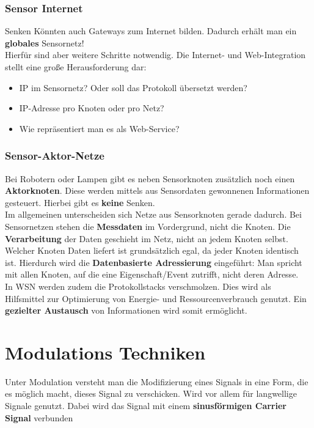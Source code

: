 \documentclass[a4paper]{article}
\begin{document}
\subsubsection{Sensor Internet}
Senken Könnten auch Gateways zum Internet bilden. Dadurch erhält man ein \textbf{globales} Sensornetz! \\
Hierfür sind aber weitere Schritte notwendig. Die Internet- und Web-Integration stellt eine große Herausforderung dar:
\begin{itemize}
	\item IP im Sensornetz? Oder soll das Protokoll übersetzt werden?
	\item IP-Adresse pro Knoten oder pro Netz?
	\item Wie repräsentiert man es als Web-Service?
\end{itemize}
\subsubsection{Sensor-Aktor-Netze} 
Bei Robotern oder Lampen gibt es neben Sensorknoten zusätzlich noch einen \textbf{Aktorknoten}. Diese werden mittels aus Sensordaten gewonnenen Informationen gesteuert. Hierbei gibt es \textbf{keine} Senken.\\

Im allgemeinen unterscheiden sich Netze aus Sensorknoten gerade dadurch. Bei Sensornetzen stehen die \textbf{Messdaten} im Vordergrund, nicht die Knoten. Die \textbf{Verarbeitung} der Daten geschieht im Netz, nicht an jedem Knoten selbst. Welcher Knoten Daten liefert ist grundsätzlich egal, da jeder Knoten identisch ist. Hierdurch wird die \textbf{Datenbasierte Adressierung} eingeführt: Man spricht mit allen Knoten, auf die eine Eigenschaft/Event zutrifft, nicht deren Adresse.\\

In WSN werden zudem die Protokollstacks verschmolzen. Dies wird als Hilfsmittel zur Optimierung von Energie- und Ressourcenverbrauch genutzt. Ein \textbf{gezielter Austausch} von Informationen wird somit ermöglicht.

\newpage
\section{Modulations Techniken}
Unter Modulation versteht man die Modifizierung eines Signals in eine Form, die es möglich macht, dieses Signal zu verschicken. Wird vor allem für langwellige Signale genutzt. Dabei wird das Signal mit einem \textbf{sinusförmigen Carrier Signal} verbunden
\end{document}
